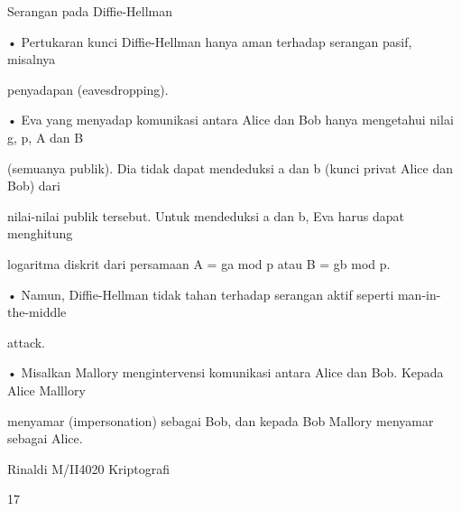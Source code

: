 \documentclass{article}
\begin{document}

Serangan pada Diffie-Hellman

• Pertukaran kunci Diffie-Hellman hanya aman terhadap serangan pasif, misalnya 

penyadapan (eavesdropping).

• Eva yang menyadap komunikasi antara Alice dan Bob hanya mengetahui nilai g, p, A dan B 

(semuanya publik). Dia tidak dapat mendeduksi a dan b (kunci privat Alice dan Bob) dari 

nilai-nilai publik tersebut. Untuk mendeduksi a dan b, Eva harus dapat menghitung 

logaritma diskrit dari persamaan A = ga mod p atau B = gb mod p.

• Namun, Diffie-Hellman tidak tahan terhadap serangan aktif seperti man-in-the-middle 

attack. 

• Misalkan Mallory mengintervensi komunikasi antara Alice dan Bob. Kepada Alice Malllory 

menyamar (impersonation) sebagai Bob, dan kepada Bob Mallory menyamar sebagai Alice.

Rinaldi M/II4020 Kriptografi

17
\end{document}
